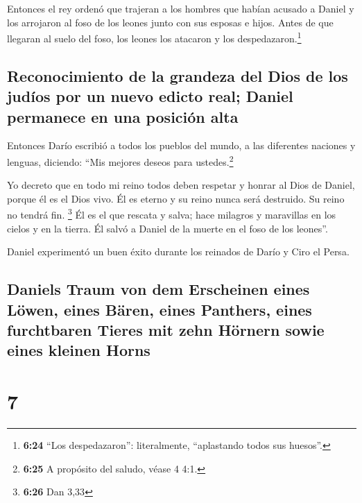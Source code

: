  Entonces el rey ordenó que trajeran a los hombres que
habían acusado a Daniel y los arrojaron al foso de los leones junto con
sus esposas e hijos. Antes de que llegaran al suelo del foso, los leones
los atacaron y los despedazaron.\footnote{\textbf{6:24} ``Los
  despedazaron'': literalmente, ``aplastando todos sus huesos''.}

\hypertarget{reconocimiento-de-la-grandeza-del-dios-de-los-juduxedos-por-un-nuevo-edicto-real-daniel-permanece-en-una-posiciuxf3n-alta}{%
\subsection{Reconocimiento de la grandeza del Dios de los judíos por un
nuevo edicto real; Daniel permanece en una posición
alta}\label{reconocimiento-de-la-grandeza-del-dios-de-los-juduxedos-por-un-nuevo-edicto-real-daniel-permanece-en-una-posiciuxf3n-alta}}

 Entonces Darío escribió a todos los pueblos del mundo, a
las diferentes naciones y lenguas, diciendo: ``Mis mejores deseos para
ustedes.\footnote{\textbf{6:25} A propósito del saludo, véase 4 4:1.}

 Yo decreto que en todo mi reino todos deben respetar y
honrar al Dios de Daniel, porque él es el Dios vivo. Él es eterno y su
reino nunca será destruido. Su reino no tendrá fin. \footnote{\textbf{6:26}
  Dan 3,33}  Él es el que rescata y salva; hace milagros
y maravillas en los cielos y en la tierra. Él salvó a Daniel de la
muerte en el foso de los leones''.

 Daniel experimentó un buen éxito durante los reinados de
Darío y Ciro el Persa.

\hypertarget{daniels-traum-von-dem-erscheinen-eines-luxf6wen-eines-buxe4ren-eines-panthers-eines-furchtbaren-tieres-mit-zehn-huxf6rnern-sowie-eines-kleinen-horns}{%
\subsection{Daniels Traum von dem Erscheinen eines Löwen, eines Bären,
eines Panthers, eines furchtbaren Tieres mit zehn Hörnern sowie eines
kleinen
Horns}\label{daniels-traum-von-dem-erscheinen-eines-luxf6wen-eines-buxe4ren-eines-panthers-eines-furchtbaren-tieres-mit-zehn-huxf6rnern-sowie-eines-kleinen-horns}}

\hypertarget{section-6}{%
\section{7}\label{section-6}}

